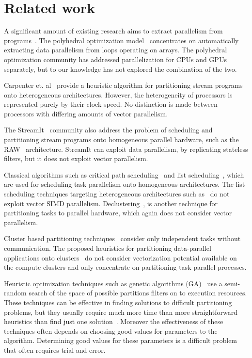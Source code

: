 \section{Related work}
\label{sec:related-work}

A significant amount of existing research aims to extract parallelism
from programs~\cite{mgri98,jdon06,mgor06,gsih93,pcar09}. The
polyhedral optimization model~\cite{mgri98} concentrates on
automatically extracting data parallelism from loops operating on
arrays. The polyhedral optimization community has addressed
parallelization for CPUs and GPUs separately, but to our knowledge has
not explored the combination of the two.

Carpenter et. al~\cite{pcar09} provide a heuristic algorithm for
partitioning stream programs onto heterogeneous architectures.
However, the heterogeneity of processors is represented purely by
their clock speed. No distinction is made between processors with
differing amounts of vector parallelism.

The StreamIt~\cite{wthi02} community also address the problem of
scheduling and partitioning stream programs onto homogeneous parallel
hardware, such as the RAW~\cite{ewai97} architecture. StreamIt can
exploit data parallelism, by replicating stateless filters, but it
does not exploit vector parallelism.

Classical algorithms such as critical path
scheduling~\cite{Kohler1975} and list scheduling~\cite{atho74}, which
are used for scheduling task parallelism onto homogeneous
architectures. The list scheduling techniques targeting heterogeneous
architectures such as~\cite{htop02} do not exploit vector SIMD
parallelism. Declustering~\cite{gsih93}, is another technique for
partitioning tasks to parallel hardware, which again does not consider
vector parallelism.

Cluster based partitioning techniques~\cite{mmah99,adou04,tbra01}
consider only independent tasks without communication. The proposed
heuristics for partitioning data-parallel applications onto
clusters~\cite{ssan05,skum02} do not consider vectorization potential
available on the compute clusters and only concentrate on partitioning
task parallel processes.

Heuristic optimization techniques such as genetic algorithms
(GA)~\cite{265940,shroff1996genetic,singh1995mapping,wang1996genetic}
use a semi-random search of the space of possible partitions filters on to
execution resources. These techniques
can be effective in finding solutions to difficult partitioning
problems, but they usually require much more time than more
straightforward heuristics than find just one solution~\cite{tbra01}.
Moreover the effectiveness of these techniques often depends on
choosing good values for parameters to the algorithm. Determining
good values for these parameters is a difficult problem that
often requires trial and error.


